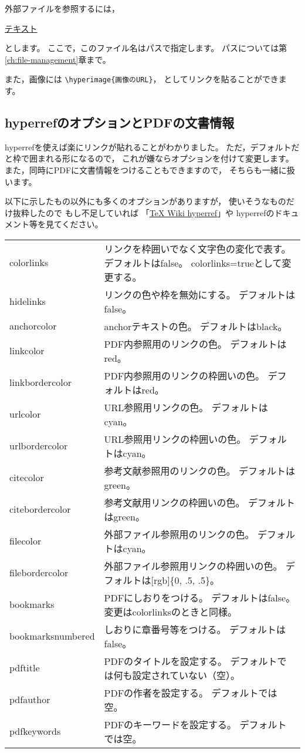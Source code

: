 外部ファイルを参照するには，
\begin{ITeX}
\href{ファイル名}{テキスト}
\end{ITeX}
とします。
ここで，このファイル名はパスで指定します。
パスについては第\ref{ch:file-management}章まで。

また，画像には
\verb|\hyperimage{画像のURL}|，
としてリンクを貼ることができます。


\subsection{hyperrefのオプションとPDFの文書情報}
hyperrefを使えば楽にリンクが貼れることがわかりました。
ただ，デフォルトだと枠で囲まれる形になるので，
これが嫌ならオプションを付けて変更します。
また，同時にPDFに文書情報をつけることもできますので，
そちらも一緒に扱います。

以下に示したもの以外にも多くのオプションがありますが，
使いそうなものだけ抜粋したので
もし不足していれば
「\href{https://texwiki.texjp.org/?hyperref}{TeX Wiki hyperref}」や
hyperrefのドキュメント等を見てください。

\begin{table}[H]
\label{tab:options-of-hyperef}
\begin{center}
\begin{longtable}{lp{}}
colorlinks &
	リンクを枠囲いでなく文字色の変化で表す。
	デフォルトはfalse。
	colorlinks=trueとして変更する。\\
hidelinks &
	リンクの色や枠を無効にする。
	デフォルトはfalse。\\
anchorcolor &
	anchorテキストの色。
	デフォルトはblack。\\
linkcolor &
	PDF内参照用のリンクの色。
	デフォルトはred。\\
linkbordercolor &
	PDF内参照用のリンクの枠囲いの色。
	デフォルトはred。\\
urlcolor &
	URL参照用リンクの色。
	デフォルトはcyan。\\
urlbordercolor &
	URL参照用リンクの枠囲いの色。
	デフォルトはcyan。\\
citecolor &
	参考文献参照用のリンクの色。
	デフォルトはgreen。\\
citebordercolor &
	参考文献用リンクの枠囲いの色。
	デフォルトはgreen。\\
filecolor &
	外部ファイル参照用のリンクの色。
	デフォルトはcyan。\\
filebordercolor &
	外部ファイル参照用リンクの枠囲いの色。
	デフォルトは[rgb]\{0, .5, .5\}。\\
bookmarks &	
	PDFにしおりをつける。
	デフォルトはfalse。
	変更はcolorlinksのときと同様。\\
bookmarksnumbered &
	しおりに章番号等をつける。
	デフォルトはfalse。\\
pdftitle &
	PDFのタイトルを設定する。
	デフォルトでは何も設定されていない（空）。\\
pdfauthor &
	PDFの作者を設定する。
	デフォルトでは空。\\
pdfkeywords &
	PDFのキーワードを設定する。
	デフォルトでは空。
\end{longtable}
\end{center}
\end{table}

